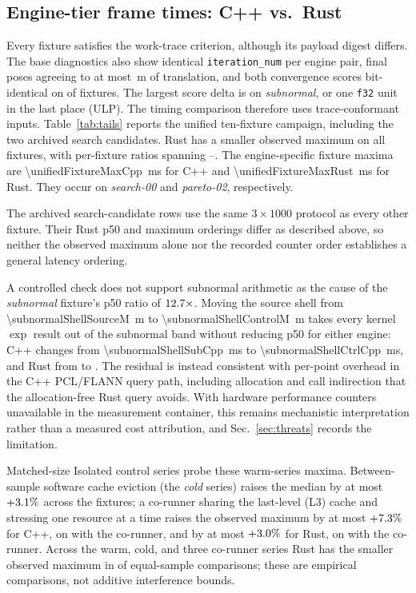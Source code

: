 \subsection{Engine-tier frame times: C++ vs.\ Rust}
\label{sec:eval-tails}
Every fixture satisfies the work-trace criterion, although its payload digest differs.
The base diagnostics also
show identical \texttt{iteration\_num} per engine pair, final poses agreeing to at most
\certMaxTransDelta\,\si{m} of translation, and both convergence scores bit-identical on
\certScoreExact{} of \certFixtures{} fixtures.
The largest score delta is \certMaxScoreDelta{} on \emph{subnormal}, or one \texttt{f32} unit in the last place (ULP).
The timing comparison therefore uses trace-conformant inputs.
Table~\ref{tab:tails} reports the unified ten-fixture campaign, including the two archived
search candidates. Rust has a smaller observed maximum on all \tailsRustFasterCount{}
fixtures, with per-fixture ratios spanning \tailsRatioMin--\tailsRatioMax. The
engine-specific fixture maxima are \SI{\unifiedFixtureMaxCpp}{ms} for C++ and
\SI{\unifiedFixtureMaxRust}{ms} for Rust. They occur on \emph{search-00} and
\emph{pareto-02}, respectively.


The archived search-candidate rows use the same $3{\times}1000$ protocol as every other fixture. Their Rust
p50 and maximum orderings differ as described above, so neither the observed maximum alone
nor the recorded counter order establishes a general latency ordering.

A controlled check does not support subnormal arithmetic as the cause of the
\emph{subnormal} fixture's p50 ratio of $12.7\times$. Moving the source
shell from \SI{\subnormalShellSourceM}{m} to \SI{\subnormalShellControlM}{m} takes every
kernel $\exp$ result out of the subnormal band without reducing p50 for either engine: C++
changes from \SI{\subnormalShellSubCpp}{ms} to \SI{\subnormalShellCtrlCpp}{ms}, and Rust
from \subnormalShellSubRust{} to \subnormalShellCtrlRust. The residual is instead
consistent with per-point overhead in the C++ PCL/FLANN query path, including allocation and
call indirection that the allocation-free Rust query avoids. With hardware performance
counters unavailable in the measurement container, this remains mechanistic interpretation
rather than a measured cost attribution, and Sec.~\ref{sec:threats} records the limitation.

Matched-size Isolated control series probe these warm-series maxima. Between-sample software
cache eviction (the \emph{cold} series) raises the median by at most $+3.1\%$
across the fixtures; a co-runner sharing the last-level (L3) cache and stressing one resource
at a time raises the observed maximum by at most $+7.3\%$ for C++, on
\coWorstCppFixture{} with the \coWorstCppMode{} co-runner, and by at most
$+3.0\%$ for Rust, on \coWorstRustFixture{} with the \coWorstRustMode{}
co-runner. Across the warm, cold, and three co-runner series Rust
has the smaller observed maximum in \coRustLowerCells{} of \coPairedCells{} equal-sample
comparisons; these are empirical comparisons, not additive interference bounds.

